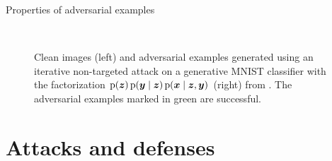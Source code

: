 \documentclass{beamer}
\newcommand{\citet}[1]{{\color{citecolor}\relscale{0.8}\textcite{#1}}}
\begin{document}
\begin{frame}[allowframebreaks=0.9]{Properties of adversarial examples}
\begin{figure}
	\begin{center}
		\
	\end{center}
	\caption{Clean images (left) and adversarial examples generated using an iterative non-targeted attack on a generative MNIST classifier with the factorization $\operatorname{\mathrm{p}}(\boldsymbol{z})\operatorname{\mathrm{p}}(\boldsymbol{y}\mid\boldsymbol{z})\operatorname{\mathrm{p}}(\boldsymbol{x}\mid\boldsymbol{z},\boldsymbol{y})$ (right) from \citet{Li:2019:AGCMRAA}. The adversarial examples marked in green are successful.}
	\label{fig:li-gfz-adversarial-examples-mnist}
\end{figure}
\end{frame}

\section{Attacks and defenses}
\end{document}
